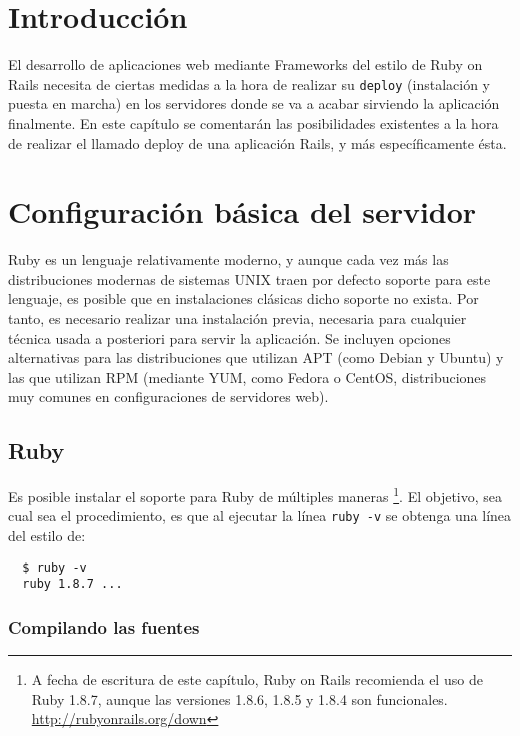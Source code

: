 \section{Introducción} %
\label{sec:introducccion}

El desarrollo de aplicaciones web mediante Frameworks del estilo de Ruby on Rails necesita de ciertas medidas a la hora de realizar su \texttt{deploy} (instalación y puesta en marcha) en los servidores donde se va a acabar sirviendo la aplicación finalmente. En este capítulo se comentarán las posibilidades existentes a la hora de realizar el llamado deploy de una aplicación Rails, y más específicamente ésta.

\section{Configuración básica del servidor} %
\label{sub:configuracion_basica_del_servidor}

Ruby es un lenguaje relativamente moderno, y aunque cada vez más las distribuciones modernas de sistemas UNIX traen por defecto soporte para este lenguaje, es posible que en instalaciones clásicas dicho soporte no exista. Por tanto, es necesario realizar una instalación previa, necesaria para cualquier técnica usada a posteriori para servir la aplicación. Se incluyen opciones alternativas para las distribuciones que utilizan APT (como Debian y Ubuntu) y las que utilizan RPM (mediante YUM, como Fedora o CentOS, distribuciones muy comunes en configuraciones de servidores web).

\subsection{Ruby} %
\label{ssub:ruby}

Es posible instalar el soporte para Ruby de múltiples maneras \footnote{A fecha de escritura de este capítulo, Ruby on Rails recomienda el uso de Ruby 1.8.7, aunque las versiones 1.8.6, 1.8.5 y 1.8.4 son funcionales. \url{http://rubyonrails.org/down}}. El objetivo, sea cual sea el procedimiento, es que al ejecutar la línea \texttt{ruby -v} se obtenga una línea del estilo de:

\begin{verbatim}
  $ ruby -v
  ruby 1.8.7 ...
\end{verbatim}

\subsubsection{Compilando las fuentes} %
\label{ssub:compilando_las_fuentes}

